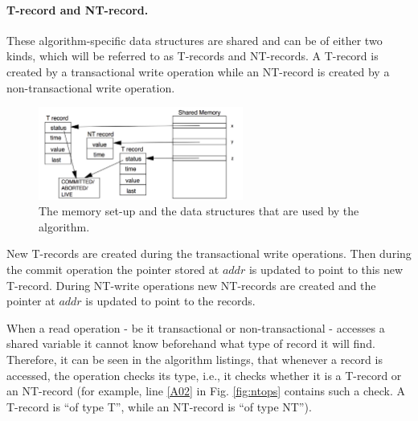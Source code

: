 \paragraph{T-record  and NT-record.}
These  algorithm-specific  data structures  are shared  and  can be  of 
either  two  kinds, which will be referred   to as T-records and NT-records. 
A T-record is created by a transactional write operation while an 
NT-record is created by a  non-transactional write operation.


\begin{figure}[ht]
\centerline{
    \mbox{\includegraphics[width=0.6\textwidth]{SI/imgs/mem_setup_single}}
}
\caption{The memory set-up and the data structures that are used by the 
algorithm.}
\label{fig:mem_setup}
\end{figure}

New T-records are created during the transactional write operations.
Then during
the commit operation the pointer stored at $\mathit{addr}$ is updated to point to this new T-record.
During NT-write operations new NT-records are created and the pointer at $\mathit{addr}$
is updated to point to the records.

When a read operation - be it transactional or non-transactional - accesses 
a shared variable it cannot know beforehand what type of record it will find. 
Therefore, it can be seen in the algorithm listings, that whenever 
a record is accessed, 
the operation checks its type, i.e., it checks 
whether it is a T-record or an NT-record (for example, line \ref{A02} in Fig.
\ref{fig:ntops} contains such a check. A T-record is {}``of type T'', while an 
NT-record is {}``of type NT''). 


